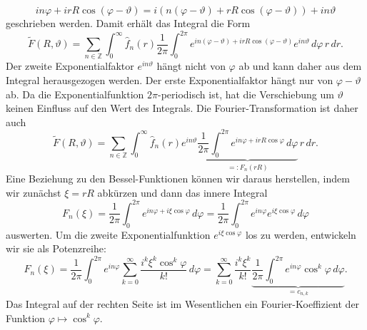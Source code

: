 \[
in\varphi+irR\cos(\varphi-\vartheta)
=
i(n(\varphi-\vartheta)+rR\cos(\varphi-\vartheta))
+
in\vartheta
\]
geschrieben werden.
Damit erhält das Integral die Form
\[
\tilde{F}(R,\vartheta)
=
\sum_{n\in\mathbb{Z}}
\int_0^\infty
\hat{f}_n(r)
\frac{1}{2\pi}
\int_0^{2\pi}
e^{in(\varphi-\vartheta)+irR\cos(\varphi-\vartheta)}
e^{in\vartheta}
\,d\varphi
\,
r\,dr.
\]
Der zweite Exponentialfaktor $e^{in\vartheta}$
hängt nicht von $\varphi$ ab und kann daher
aus dem Integral herausgezogen werden.
Der erste Exponentialfaktor hängt nur von $\varphi-\vartheta$ ab.
Da die Exponentialfunktion $2\pi$-periodisch ist, hat die Verschiebung
um $\vartheta$ keinen Einfluss auf den Wert des Integrals.
Die Fourier-Transformation ist daher auch
\[
\tilde{F}(R,\vartheta)
=
\sum_{n\in\mathbb{Z}}
\int_0^\infty
\hat{f}_n(r)
e^{in\vartheta}
\underbrace{
\frac{1}{2\pi}
\int_0^{2\pi}
e^{in\varphi+irR\cos\varphi}
\,d\varphi
}_{\displaystyle =:F_n(rR)}
\,
r\,dr.
\]
Eine Beziehung zu den Bessel-Funktionen können wir daraus herstellen,
indem wir zunächst $\xi = rR$ abkürzen und dann das innere Integral
\begin{equation}
F_n(\xi)
=
\frac{1}{2\pi}
\int_{0}^{2\pi}
e^{in\varphi+i\xi\cos\varphi}
\,d\varphi
=
\frac{1}{2\pi}
\int_{0}^{2\pi}
e^{in\varphi}e^{i\xi\cos\varphi}
\,d\varphi
\label{buch:fourier:eqn:Fncosphi}
\end{equation}
auswerten.
Um die zweite Exponentialfunktion $e^{i\xi\cos\varphi}$ los zu werden,
entwickeln wir sie als Potenzreihe:
\[
F_n(\xi)
=
\frac{1}{2\pi}
\int_0^{2\pi}
e^{in\varphi}
\sum_{k=0}^\infty
\frac{
i^k\xi^k \cos^k\varphi
}{k!}
\,d\varphi
=
\sum_{k=0}^\infty
\frac{i^k\xi^k}{k!}
\underbrace{
\frac{1}{2\pi}
\int_0^{2\pi}
e^{in\varphi}
\cos^k\varphi
\,d\varphi}_{\displaystyle =c_{n,k}}.
\]
Das Integral auf der rechten Seite ist im Wesentlichen ein
Fourier-Koeffizient der Funktion $\varphi\mapsto \cos^k\varphi$.

%
%
